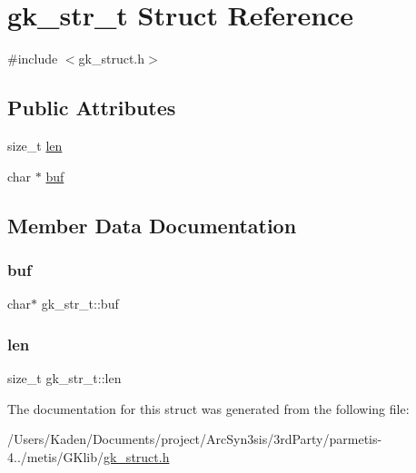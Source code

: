 \hypertarget{a00642}{}\section{gk\+\_\+str\+\_\+t Struct Reference}
\label{a00642}


{\ttfamily \#include $<$gk\+\_\+struct.\+h$>$}

\subsection*{Public Attributes}
\begin{DoxyCompactItemize}
\item 
size\+\_\+t \hyperlink{a00642_acce3955b5ce3c8b9965e7163aad9705d}{len}
\item 
char $\ast$ \hyperlink{a00642_a865fb5b4ddc39efeb3c86e2251f13380}{buf}
\end{DoxyCompactItemize}


\subsection{Member Data Documentation}
\mbox{\label{a00642_a865fb5b4ddc39efeb3c86e2251f13380}} 
\subsubsection{\texorpdfstring{buf}{buf}}
{\footnotesize\ttfamily char$\ast$ gk\+\_\+str\+\_\+t\+::buf}

\mbox{\label{a00642_acce3955b5ce3c8b9965e7163aad9705d}} 
\subsubsection{\texorpdfstring{len}{len}}
{\footnotesize\ttfamily size\+\_\+t gk\+\_\+str\+\_\+t\+::len}



The documentation for this struct was generated from the following file\+:\begin{DoxyCompactItemize}
\item 
/\+Users/\+Kaden/\+Documents/project/\+Arc\+Syn3sis/3rd\+Party/parmetis-\/4../metis/\+G\+Klib/\hyperlink{a00080}{gk\+\_\+struct.\+h}\end{DoxyCompactItemize}

